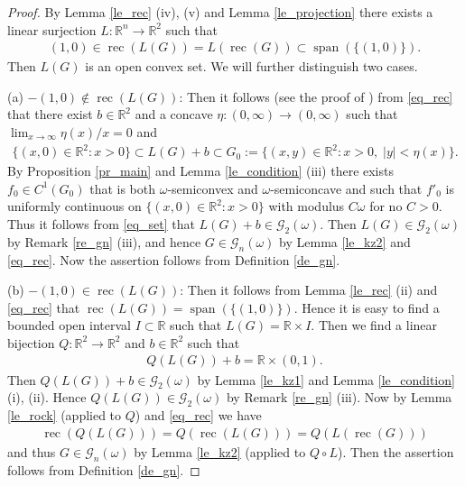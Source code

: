 \documentclass[10pt,a4paper]{amsart}
\theoremstyle{definition}
\newcommand{\R}{\mathbb{R}}
\newcommand{\rec}{\operatorname{rec}}
\newcommand{\spann}{\operatorname{span}}
\begin{document}
\begin{proof}
By Lemma \ref{le_rec} (iv), (v) and Lemma \ref{le_projection} there exists a linear surjection $ L:\R^n\to\R^2 $ such that
\begin{align}\label{eq_rec}
(1,0)\in\rec(L(G))=L(\rec(G))\subset\spann(\lbrace (1,0)\rbrace).
\end{align}
Then $ L(G) $ is an open convex set. We will further distinguish two cases. 

(a) $ -(1,0)\notin \rec(L(G)) $: Then it follows (see the proof of \cite[Proposition 5.13]{KZ}) from \eqref{eq_rec} that there exist $ b\in\R^2 $ and a concave $ \eta:(0,\infty)\to(0,\infty) $ such that $ \lim_{x\to\infty}\eta(x)/x=0 $ and
\begin{align}\label{eq_set}
\lbrace (x,0)\in\R^2:x>0\rbrace\subset L(G)+b\subset G_0:=\lbrace (x,y)\in\R^2:x>0,\;\vert y\vert<\eta(x)\rbrace.
\end{align}
By Proposition \ref{pr_main} and Lemma \ref{le_condition} (iii) there exists $ f_0\in C^1(G_0) $ that is both $ \omega $-semiconvex and $ \omega $-semiconcave and such that $ f'_0 $ is uniformly continuous on $ \lbrace (x,0)\in\R^2:x>0\rbrace $ with modulus $ C\omega $ for no $ C>0 $. Thus it follows from \eqref{eq_set} that $ L(G)+b\in\mathcal{G}_2(\omega) $. Then $ L(G)\in\mathcal{G}_2(\omega) $ by Remark \ref{re_gn} (iii), and hence $ G\in\mathcal{G}_n(\omega) $ by Lemma \ref{le_kz2} and \eqref{eq_rec}. Now the assertion follows from Definition \ref{de_gn}.

(b) $ -(1,0)\in\rec(L(G)) $: Then it follows from Lemma \ref{le_rec} (ii) and \eqref{eq_rec} that $ \rec(L(G))=\spann(\lbrace (1,0)\rbrace) $. Hence it is easy to find a bounded open interval $ I\subset\R $ such that $ L(G)=\R\times I $. Then we find a linear bijection $ Q:\R^2\to\R^2 $ and $ b\in\R^2 $ such that
\begin{align*}
Q(L(G))+b=\R\times(0,1).
\end{align*}
Then $ Q(L(G))+b\in\mathcal{G}_2(\omega) $ by Lemma \ref{le_kz1} and Lemma \ref{le_condition} (i), (ii). Hence $ Q(L(G))\in\mathcal{G}_2(\omega) $ by Remark \ref{re_gn} (iii). Now by Lemma \ref{le_rock} (applied to $ Q $) and \eqref{eq_rec} we have
\begin{align*}
\rec(Q(L(G)))=Q(\rec(L(G)))=Q(L(\rec(G)))
\end{align*}
and thus $ G\in\mathcal{G}_n(\omega) $ by Lemma \ref{le_kz2} (applied to $ Q\circ L $). Then the assertion follows from Definition \ref{de_gn}.
\end{proof}
\end{document}
